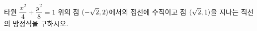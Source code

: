 타원 $\dfrac{x^2}{4}+\dfrac{y^2}{8}=1$ 위의 점 $(-\sqrt{2}{,}\mkern3mu\mathopen{}2)$에서의 접선에 수직이고 점 $(\sqrt{2}{,}\mkern3mu\mathopen{}1)$을 지나는 직선의 방정식을 구하시오.
